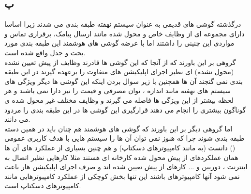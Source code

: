 \documentclass{article}
\begin{document}
\subsection{ب}
درگذشته گوشی های قدیمی به عنوان سیستم نهفته طبقه بندی می شدند زیرا اساسا دارای مجموعه ای از وظایف خاص و محول شده مانند ارسال پیامک، برقراری تماس و مواردی این چنینی را داشتند اما با عرضه گوشی های هوشمند این طبقه بندی مورد بحث و جدل واقع شده است.\\گروهی بر این باورند که از آنجا که این گوشی ها قادرند وظایف از پیش تعیین نشده (محول نشده) ای نظیر اجرای اپلیکیشن های متفاوت را برعهده گیرند در این طبقه بندی نمی گنجند آن ها همچنین با زیر سوال بردن اینکه این گوشی ها دیگر ویژگی های سیستم های نهفته مانند اندازه ، توان مصرفی و قیمت را نیز دارا نمی باشند و هر لحظه بیشتر از این ویژگی ها فاصله می گیرند و وظایف مختلف غیر محول شده ی گوناگون بیشتری را انجام می دهند قرارگیری این گوشی ها در این طبقه بندی را مردود می دانند.\\اما گروهی دیگر بر این باورند که گوشی های هوشمند هم چنان باید در همین دسته طبقه بندی شوند چرا که هنوز نمی توان آن ها را سیستم هایی با هدف کاربری عمومی () دانست (به مانند کامپیوترهای دسکتاپ) و هم چنین بسیاری از عملکرد های آن ها همان عملکردهای از پیش محول شده کارخانه ای هستند مثلا کارهایی نظیر اتصال به اینترنت ، دوربین و ... کارهای از پیش تعیین شده اند و صرف اجرای اپلیکیشن هار باعث نمی شود آنها کامپیوترهای  باشند این تنها بخش کوچکی از عملکرد کامپبوترهایی  مانند کامپیوترهای دسکتاپ است.
\end{document}
